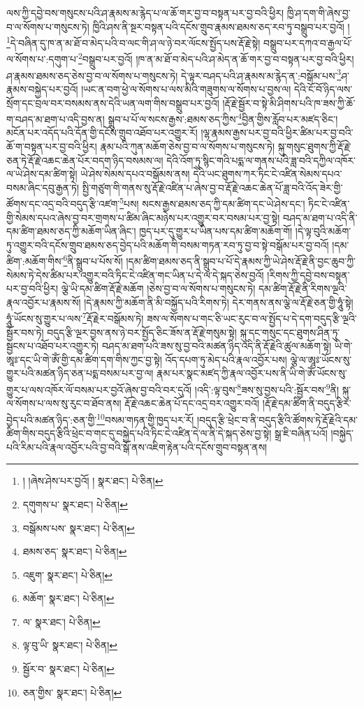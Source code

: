 ལས་ཀྱི་དབྱེ་བས་གསུངས་པའི་ཤ་རྣམས་མ་རྙེད་པ་ལ་ཆོ་གར་བྱ་བ་བསྟན་པར་བྱ་བའི་ཕྱིར། ཁྱི་ཤ་དག་གི་ཞེས་བྱ་བ་ལ་སོགས་པ་གསུངས་ཏེ། ཁྱིའི་ཤས་ནི་སྔར་བསྟན་པའི་དངོས་གྲུབ་རྣམས་ཐམས་ཅད་རབ་ཏུ་བསྒྲུབ་པར་བྱའོ། །\footnote{། །ཞེས་ཤེས་པར་བྱའོ། །  སྣར་ཐང་།  པེ་ཅིན། }དེ་བཞིན་དུ་ཁ་ན་མ་ཐོ་བ་མེད་པའི་བ་ལང་གི་ཤ་ལ་ཉེ་བར་ལོངས་སྤྱོད་པས་རྡོ་རྗེ་སྟེ། བསྒྲུབ་པར་དཀའ་བ་རྒྱལ་པོ་ལ་སོགས་པ་:དགུག་པ་\footnote{དགུགས་པ་  སྣར་ཐང་།  པེ་ཅིན། }བསྒྲུབ་པར་བྱའོ། །ཁ་ན་མ་ཐོ་བ་མེད་པའི་ཤ་མེད་ན་ཆོ་གར་བྱ་བ་བསྟན་པར་བྱ་བའི་ཕྱིར། ཤ་རྣམས་ཐམས་ཅད་ཅེས་བྱ་བ་ལ་སོགས་པ་གསུངས་ཏེ། དེ་ལྟར་བཤད་པའི་ཤ་རྣམས་མ་རྙེད་ན་:བསྒོམ་པས་\footnote{བསྒོམས་པས་  སྣར་ཐང་།  པེ་ཅིན། }ཤ་རྣམས་བསྐྱེད་པར་བྱའོ། །ཡང་ན་བག་ཕྱེ་ལ་སོགས་པ་ལས་མིའི་གཟུགས་ལ་སོགས་པ་བྱས་ལ། དེའི་ངོ་བོ་ཉིད་ལས་སྲོག་དང་བྲལ་བར་བསམས་ནས་དེའི་ཡན་ལག་གིས་བསྒྲུབ་པར་བྱའོ། །རྡོ་རྗེ་སྦྱོར་བ་སྟེ་མི་ཤིགས་པའི་ཁ་ཟས་ཀྱི་ཆོ་ག་བཤད་མ་ཐག་པ་འདི་བྱས་ན། སྒྲུབ་པ་པོ་ལ་སངས་རྒྱས་:ཐམས་ཅད་ཀྱིས་\footnote{ཐམས་ཅད་  སྣར་ཐང་།  པེ་ཅིན། }བྱིན་གྱིས་རློབ་པར་མཛད་ཅིང་། མངོན་པར་འདོད་པའི་དོན་གྱི་དངོས་གྲུབ་འཐོབ་པར་འགྱུར་རོ། །ལྷ་རྣམས་རྒྱས་པར་བྱ་བའི་ཕྱིར་ཚིམ་པར་བྱ་བའི་ཆོ་ག་བསྟན་པར་བྱ་བའི་ཕྱིར། རྣམ་པའི་ཀུན་མཆོག་ཅེས་བྱ་བ་ལ་སོགས་པ་གསུངས་ཏེ། སྐུ་གསུང་ཐུགས་ཀྱི་རྡོ་རྗེ་ཅན་ཏེ་རྡོ་རྗེ་འཆང་ཆེན་པོར་བདག་ཉིད་བསམས་ལ། དེའི་འོག་ཏུ་སྙིང་གའི་པདྨ་ལ་གནས་པའི་ཟླ་བའི་དཀྱིལ་འཁོར་ལ་ཡེ་ཤེས་དམ་ཚིག་སྟེ། ཡེ་ཤེས་སེམས་དཔའ་བསྒོམས་ནས། དེའི་ཡང་ཐུགས་ཀར་ཏིང་ངེ་འཛིན་སེམས་དཔའ་བསམ་ཞིང་དབུ་རྒྱན་ཏེ། སྤྱི་གཙུག་གི་གནས་སུ་རྡོ་རྗེ་འཛིན་པ་ཞེས་བྱ་བ་རྡོ་རྗེ་འཆང་ཆེན་པོ་ཟླ་བའི་འོད་ཟེར་གྱི་ཚོགས་དང་འདྲ་བའི་བདུད་རྩི་འཛག་\footnote{འཇུག་  སྣར་ཐང་།  པེ་ཅིན། }པས། སངས་རྒྱས་ཐམས་ཅད་ཀྱི་དམ་ཚིག་དང་ཡེ་ཤེས་དང་། ཏིང་ངེ་འཛིན་གྱི་སེམས་དཔའ་ཞེས་བྱ་བར་གྲགས་པ་ཚིམ་ཞིང་མཉེས་པར་འགྱུར་བར་བསམ་པར་བྱ་སྟེ། བཤད་མ་ཐག་པ་འདི་ནི་དམ་ཚིག་ཐམས་ཅད་ཀྱི་མཆོག་ཡིན་ཞིང་། ཁྱད་པར་དུ་གྱུར་པ་ཡིན་པས་དམ་ཚིག་མཆོག་གོ། །དེ་ལྟ་བུའི་མཆོག་ཏུ་འགྱུར་བའི་དངོས་གྲུབ་ཐམས་ཅད་བྱེད་པའི་མཆོག་གི་བསམ་གཏན་རབ་ཏུ་བྱ་བ་སྟེ་བསྒོམ་པར་བྱ་བའོ། །དམ་ཚིག་:མཆོག་གིས་\footnote{མཆོག་  སྣར་ཐང་།  པེ་ཅིན། }ནི་སྒྲུབ་པ་པོས་སོ། །དམ་ཚིག་ཐམས་ཅད་ནི་སྒྲུབ་པ་པོ་དེ་རྣམས་ཀྱི་ཡེ་ཤེས་རྡོ་རྗེ་ནི་བྱང་ཆུབ་ཀྱི་སེམས་ཏེ་དེས་ཚིམ་པར་འགྱུར་བའི་ཏིང་ངེ་འཛིན་གང་ཡིན་པ་དེ་ལ་དེ་སྐད་ཅེས་བྱའོ། །རིགས་ཀྱི་དབྱེ་བས་བསྟན་པར་བྱ་བའི་ཕྱིར། ལྕེ་ཡི་དམ་ཚིག་རྡོ་རྗེ་མཆོག །ཅེས་བྱ་བ་ལ་སོགས་པ་གསུངས་ཏེ། དམ་ཚིག་རྡོ་རྗེ་ནི་རིགས་ལྔའི་རྣལ་འབྱོར་པ་རྣམས་སོ། །དེ་རྣམས་ཀྱི་མཆོག་ནི་མི་བསྐྱོད་པའི་རིགས་ཏེ། དེར་གནས་ནས་ལྕེ་ལ་རྡོ་རྗེ་ཅན་གྱི་ཧཱུཾ་སྟེ། ཧཱུཾ་ཡོངས་སུ་གྱུར་པ་ལས་\footnote{ལ་  སྣར་ཐང་།  པེ་ཅིན། }རྡོ་རྗེར་བསྒོམས་ཏེ། ཟས་ལ་སོགས་པ་གང་ཅི་ཡང་རུང་བ་ལ་སྤྱོད་པ་དེ་དག་བདུད་རྩི་ལྔའི་སྦྱོར་བས་ཏེ། བདུད་རྩི་ལྔར་བྱས་ནས་ཉེ་བར་སྤྱོད་ཅིང་ཟོས་ན་རྡོ་རྗེ་གསུམ་སྟེ། སྐུ་དང་གསུང་དང་ཐུགས་ཤིན་ཏུ་སྦྱངས་པ་འཐོབ་པར་འགྱུར་ཏེ། བཤད་མ་ཐག་པའི་ཟས་སུ་བྱ་བའི་མཚན་ཉིད་འདི་ནི་རྡོ་རྗེའི་ཚུལ་མཆོག་སྟེ། ཡི་གེ་ཨཱཿ་དང་ཡི་གེ་ཨོཾ་གྱི་དམ་ཚིག་དག་གིས་ཀྱང་བྱ་སྟེ། འོད་དཔག་ཏུ་མེད་པའི་རྣལ་འབྱོར་པས། ལྕེ་ལ་ཨཱཿ་ཡོངས་སུ་གྱུར་པའི་མཚན་ཉིད་ཅན་པདྨ་བསམ་པར་བྱ་ལ། རྣམ་པར་སྣང་མཛད་ཀྱི་རྣལ་འབྱོར་པས་ནི་ཡི་གེ་ཨོཾ་ཡོངས་སུ་གྱུར་པ་ལས་འཁོར་ལོ་བསམ་པར་བྱའོ་ཞེས་བྱ་བའི་བར་དུའོ། །འདི་:ལྟ་བུས་\footnote{ལྟ་བུ་ཡི་  སྣར་ཐང་།  པེ་ཅིན། }ཟས་སུ་བྱས་པའི་:སྦྱོར་བས་\footnote{སྦྱོར་བ་  སྣར་ཐང་།  པེ་ཅིན། }ནི། སྐུ་ལ་སོགས་པ་ལས་སུ་རུང་བ་ཐོབ་ནས། རྡོ་རྗེ་འཆང་ཆེན་པོ་དང་འདྲ་བར་འགྱུར་བའོ། །རྡོ་རྗེ་དམ་ཚིག་ནི་བདུད་རྩིར་བྱེད་པའི་མཚན་ཉིད་:ཅན་གྱི་\footnote{ཅན་གྱིས་  སྣར་ཐང་།  པེ་ཅིན། }བསམ་གཏན་གྱི་ཁྱད་པར་རོ། །བདུད་རྩི་ཕྲེང་བ་ནི་བདུད་རྩིའི་ཚོགས་ཏེ་རྡོ་རྗེའི་དམ་ཚིག་གིས་བདུད་རྩིའི་ཕྲེང་བ་གང་དུ་བསྐྱེད་པའི་ཏིང་ངེ་འཛིན་དེ་ལ་ནི་དེ་སྐད་ཅེས་བྱ་སྟེ། སྒྲ་ཇི་བཞིན་པའོ། །བསྐྱེད་པའི་རིམ་པའི་རྣལ་འབྱོར་པའི་བྱ་བའི་སྒོ་ནས་འཇིག་རྟེན་པའི་དངོས་གྲུབ་བསྟན་ནས། 